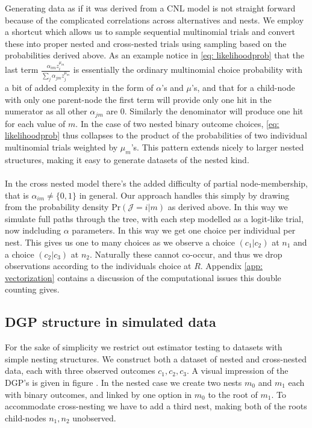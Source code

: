 Generating data as if it was derived from a CNL model is not straight forward because of the complicated correlations across alternatives and nests. We employ a shortcut which allows us to sample sequential multinomial trials and convert these into proper nested and cross-nested trials using sampling based on the probabilities derived above. As an example notice in \eqref{eq: likelihoodprob} that the last term $\frac{\alpha_{im}z_i^{\mu_m}}{\sum_j \alpha_{jm} z_j^{\mu_m}}$ is essentially the ordinary multinomial choice probability with a bit of added complexity in the form of $\alpha$'s and $\mu$'s, and that for a child-node with only one parent-node the first term will provide only one hit in the numerator as all other $\alpha_{jm}$ are $0$. Similarly the denominator will produce one hit for each value of $m$. In the case of two nested binary outcome choices, \eqref{eq: likelihoodprob} thus collapses to the product of the probabilities of two individual multinomial trials weighted by $\mu_m$'s. This pattern extends nicely to larger nested structures, making it easy to generate datasets of the nested kind.
\\ \\
In the cross nested model there's the added difficulty of partial node-membership, that is $\alpha_{im} \neq \{0,1\}$ in general. Our approach handles this simply by drawing from the probability density $\textrm{Pr}(\mathcal{J} = i |m)$ as derived above. In this way we simulate full paths through the tree, with each step modelled as a logit-like trial, now indcluding $\alpha$ parameters. In this way we get one choice per individual per nest. This gives us one to many choices as we observe a choice $(c_1|c_2)$ at $n_1$ and a choice $(c_2|c_3)$ at $n_2$. Naturally these cannot co-occur, and thus we drop observations according to the individuals choice at $R$. Appendix \ref{app: vectorization} contains a discussion of the computational issues this double counting gives.

\subsection{DGP structure in simulated data}
For the sake of simplicity we restrict out estimator testing to datasets with simple nesting structures. We construct both a dataset of nested and cross-nested data, each with three observed outcomes $c_1, c_2, c_3$. A visual impression of the DGP's is given in figure . In the nested case we create two nests $m_0$ and $m_1$ each with binary outcomes, and linked by one option in $m_0$ to the root of $m_1$. To accommodate cross-nesting we have to add a third nest, making both of the roots child-nodes $n_1,n_2$ unobserved.

